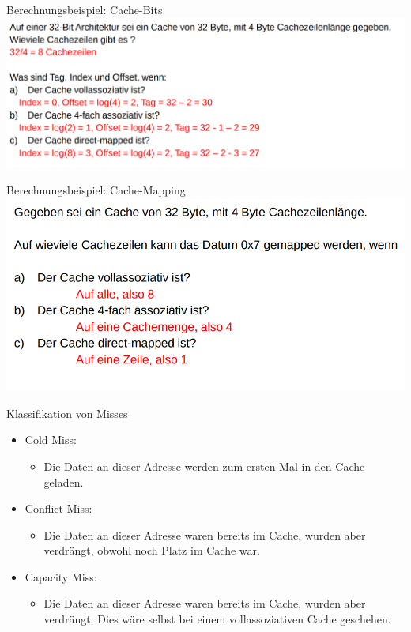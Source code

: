 \documentclass[
  german,            %
  aspectratio=169,    %
]{tumbeamer}
\begin{document}
\begin{frame}[c]{Berechnungsbeispiel: Cache-Bits}{}
  \includegraphics[width=\linewidth]{w05_berechnungsbeispiel1_rep.png}
\end{frame}

\begin{frame}[c]{Berechnungsbeispiel: Cache-Mapping}{}
  \includegraphics[width=0.8\linewidth]{w05_berechungsbesipiel_mapping_rep.png}
\end{frame}

\begin{frame}[c]{Klassifikation von Misses}{}
  \begin{itemize}
      \item Cold Miss:
      \begin{itemize}
          \item Die Daten an dieser Adresse werden zum ersten Mal in den Cache geladen.
      \end{itemize}
      \item Conflict Miss:
      \begin{itemize}
          \item Die Daten an dieser Adresse waren bereits im Cache, wurden aber verdrängt, obwohl noch Platz im Cache war.
      \end{itemize}
      \item Capacity Miss:
      \begin{itemize}
          \item Die Daten an dieser Adresse waren bereits im Cache, wurden aber verdrängt. Dies wäre selbst bei einem vollassoziativen Cache geschehen.
      \end{itemize}
  \end{itemize}
\end{frame}
\end{document}

